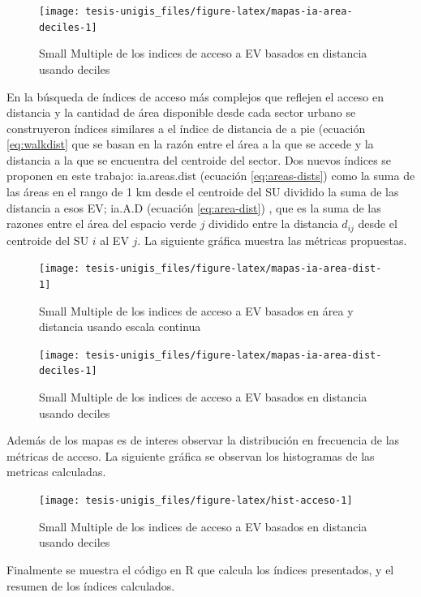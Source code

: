\documentclass[12pt,]{book}
\begin{document}
\begin{figure}
\texttt{[image: tesis-unigis\_files/figure-latex/mapas-ia-area-deciles-1]} \caption{Small Multiple de los indices de acceso a EV basados en distancia usando deciles}\label{fig:mapas-ia-area-deciles}
\end{figure}

En la búsqueda de índices de acceso más complejos que reflejen el acceso
en distancia y la cantidad de área disponible desde cada sector urbano
se construyeron índices similares a el índice de distancia de a pie
(ecuación \eqref{eq:walkdist} que se basan en la razón entre el área a la
que se accede y la distancia a la que se encuentra del centroide del
sector. Dos nuevos índices se proponen en este trabajo: ia.areas.dist
(ecuación \eqref{eq:areas-dists}) como la suma de las áreas en el rango de
1 km desde el centroide del SU dividido la suma de las distancia a esos
EV; ia.A.D (ecuación \eqref{eq:area-dist}) , que es la suma de las razones
entre el área del espacio verde \(j\) dividido entre la distancia
\(d_{ij}\) desde el centroide del SU \(i\) al EV \(j\). La siguiente
gráfica muestra las métricas propuestas.

\begin{figure}
\texttt{[image: tesis-unigis\_files/figure-latex/mapas-ia-area-dist-1]} \caption{Small Multiple de los indices de acceso a EV basados en área y distancia usando escala continua}\label{fig:mapas-ia-area-dist}
\end{figure}

\begin{figure}
\texttt{[image: tesis-unigis\_files/figure-latex/mapas-ia-area-dist-deciles-1]} \caption{Small Multiple de los indices de acceso a EV basados en distancia usando deciles}\label{fig:mapas-ia-area-dist-deciles}
\end{figure}

Además de los mapas es de interes observar la distribución en frecuencia
de las métricas de acceso. La siguiente gráfica se observan los
histogramas de las metricas calculadas.

\begin{figure}
\texttt{[image: tesis-unigis\_files/figure-latex/hist-acceso-1]} \caption{Small Multiple de los indices de acceso a EV basados en distancia usando deciles}\label{fig:hist-acceso}
\end{figure}

Finalmente se muestra el código en R que calcula los índices
presentados, y el resumen de los índices calculados.
\end{document}
